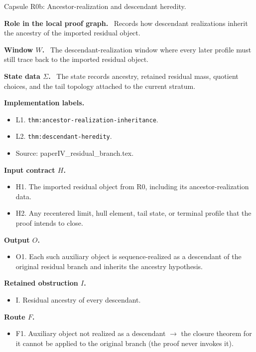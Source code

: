\documentclass[11pt]{amsart}
\newcommand{\capsulefield}[1]{\par\smallskip\noindent\textbf{#1.}\ }
\begin{document}
\begin{proofcapsule}{Capsule R0b: Ancestor-realization and descendant heredity.}
  \capsulefield{Role in the local proof graph}
  Records how descendant realizations inherit the ancestry of the imported residual object.

  \capsulefield{Window \(W\)}
The descendant-realization window where every later profile must still trace back to the imported residual object.

  \capsulefield{State data \(\Sigma\)}
The state records ancestry, retained residual mass, quotient choices, and the tail topology attached to the current stratum.

  \capsulefield{Implementation labels}
  \begin{itemize}[leftmargin=1.8em]
  \item L1. \texttt{thm:ancestor-realization-inheritance}.
  \item L2. \texttt{thm:descendant-heredity}.
  \item Source: paperIV\_residual\_branch.tex.
  \end{itemize}

  \capsulefield{Input contract \(H\)}
  \begin{itemize}[leftmargin=1.8em]
  \item H1. The imported residual object from R0, including its ancestor-realization data.
  \item H2. Any recentered limit, hull element, tail state, or terminal profile that the proof intends to close.
  \end{itemize}

  \capsulefield{Output \(O\)}
  \begin{itemize}[leftmargin=1.8em]
  \item O1. Each such auxiliary object is sequence-realized as a descendant of the original residual branch and inherits the ancestry hypothesis.
  \end{itemize}

  \capsulefield{Retained obstruction \(I\)}
  \begin{itemize}[leftmargin=1.8em]
  \item I. Residual ancestry of every descendant.
  \end{itemize}

  \capsulefield{Route \(F\)}
  \begin{itemize}[leftmargin=1.8em]
  \item F1. Auxiliary object not realized as a descendant $\to$ the closure theorem for it cannot be applied to the original branch (the proof never invokes it).
  \end{itemize}


\end{proofcapsule}
\end{document}
